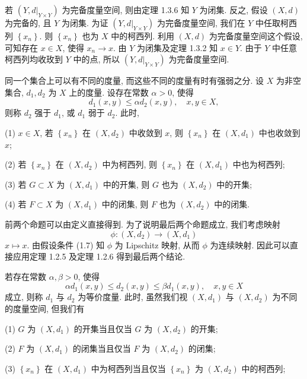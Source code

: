 \documentclass[openany]{ctexbook}
\makeatletter
\theoremstyle{kaiti}
\theoremstyle{normal}
\renewenvironment{proof}[1][\proofname]{\par
    \pushQED{\qed}%
    \normalfont \topsep6\p@\@plus6\p@\relax
    \trivlist
    \item\relax
    {\heiti #1}\hspace{2\labelsep}\ignorespaces
  }{%
    \popQED\endtrivlist\@endpefalse
  }
\makeatother
\begin{document}
\begin{proof}
若 $\left(Y,\left.d\right|_{Y \times Y}\right)$ 为完备度量空间, 则由定理 1.3.6 知 $Y$ 为闭集. 反之, 假设 $(X, d)$ 为完备的, 且 $Y$ 为闭集. 为证 $\left(Y,\left.d\right|_{Y \times Y}\right)$ 为完备度量空间, 我们在 $Y$ 中任取柯西列 $\left\{x_n\right\}$. 则 $\left\{x_n\right\}$ 也为 $X$ 中的柯西列. 利用 $(X, d)$ 为完备度量空间这个假设, 可知存在 $x \in X$, 使得 $x_n \rightarrow x$. 由 $Y$ 为闭集及定理 1.3.2 知 $x \in Y$. 由于 $Y$ 中任意柯西列均收玫到 $Y$ 中的点, 所以 $\left(Y,\left.d\right|_{Y \times Y}\right)$ 为完备度量空间.
\end{proof}

同一个集合上可以有不同的度量, 而这些不同的度量有时有强弱之分. 设 $X$ 为非空集合, $d_1, d_2$ 为 $X$ 上的度量. 设存在常数 $\alpha>0$, 使得
\begin{equation}
  d_1(x, y) \leqslant \alpha d_2(x, y), \quad x, y \in X,
\end{equation}
则称 $d_2$ 强于 $d_1$, 或 $d_1$ 弱于 $d_2$. 此时,

(1) $x \in X$, 若 $\left\{x_n\right\}$ 在 $\left(X, d_2\right)$ 中收敛到 $x$, 则 $\left\{x_n\right\}$ 在 $\left(X, d_1\right)$ 中也收敛到 $x$;

(2) 若 $\left\{x_n\right\}$ 在 $\left(X, d_2\right)$ 中为柯西列, 则 $\left\{x_n\right\}$ 在 $\left(X, d_1\right)$ 中也为柯西列;

(3) 若 $G \subset X$ 为 $\left(X, d_1\right)$ 中的开集, 则 $G$ 也为 $\left(X, d_2\right)$ 中的开集;

(4) 若 $F \subset X$ 为 $\left(X, d_1\right)$ 中的闭集, 则 $F$ 也为 $\left(X, d_2\right)$ 中的闭集.

前两个命题可以由定义直接得到. 为了说明最后两个命题成立, 我们考虑映射
$$
\phi:\left(X, d_2\right) \rightarrow\left(X, d_1\right)
$$
$x \mapsto x.$
由假设条件 (1.7) 知 $\phi$ 为 Lipschitz 映射, 从而 $\phi$ 为连续映射. 因此可以直接应用定理 1.2.5 及定理 1.2.6 得到最后两个结论.

若存在常数 $\alpha, \beta>0$, 使得
$$
\alpha d_1(x, y) \leqslant d_2(x, y) \leqslant \beta d_1(x, y), \quad x, y \in X
$$
成立, 则称 $d_1$ 与 $d_2$ 为等价度量. 此时, 虽然我们视 $\left(X, d_1\right)$ 与 $\left(X, d_2\right)$ 为不同的度量空间, 但我们有

(1) $G$ 为 $\left(X, d_1\right)$ 的开集当且仅当 $G$ 为 $\left(X, d_2\right)$ 的开集;

(2) $F$ 为 $\left(X, d_1\right)$ 的闭集当且仅当 $F$ 为 $\left(X, d_2\right)$ 的闭集;

(3) $\left\{x_n\right\}$ 在 $\left(X, d_1\right)$ 中为柯西列当且仅当 $\left\{x_n\right\}$ 为 $\left(X, d_2\right)$ 中的柯西列;
\end{document}
